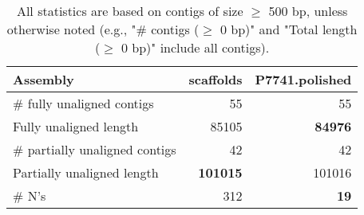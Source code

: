 \documentclass[12pt,a4paper]{article}
\begin{document}
\begin{table}[ht]
\begin{center}
\caption{All statistics are based on contigs of size $\geq$ 500 bp, unless otherwise noted (e.g., "\# contigs ($\geq$ 0 bp)" and "Total length ($\geq$ 0 bp)" include all contigs).}
\begin{tabular}{|l*{2}{|r}|}
\hline
Assembly & scaffolds & P7741.polished \\ \hline
\# fully unaligned contigs & 55 & 55 \\ \hline
Fully unaligned length & 85105 & {\bf 84976} \\ \hline
\# partially unaligned contigs & 42 & 42 \\ \hline
Partially unaligned length & {\bf 101015} & 101016 \\ \hline
\# N's & 312 & {\bf 19} \\ \hline
\end{tabular}
\end{center}
\end{table}
\end{document}
